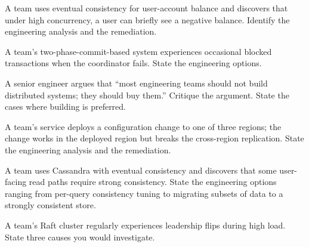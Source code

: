 \begin{exercise}
A team uses eventual consistency for user-account balance and discovers that under high concurrency, a user can briefly see a negative balance. Identify the engineering analysis and the remediation.
\end{exercise}

\begin{exercise}
A team's two-phase-commit-based system experiences occasional blocked transactions when the coordinator fails. State the engineering options.
\end{exercise}

\begin{exercise}
A senior engineer argues that ``most engineering teams should not build distributed systems; they should buy them.'' Critique the argument. State the cases where building is preferred.
\end{exercise}

\begin{exercise}
A team's service deploys a configuration change to one of three regions; the change works in the deployed region but breaks the cross-region replication. State the engineering analysis and the remediation.
\end{exercise}

\begin{exercise}
A team uses Cassandra with eventual consistency and discovers that some user-facing read paths require strong consistency. State the engineering options ranging from per-query consistency tuning to migrating subsets of data to a strongly consistent store.
\end{exercise}

\begin{exercise}
A team's Raft cluster regularly experiences leadership flips during high load. State three causes you would investigate.
\end{exercise}
